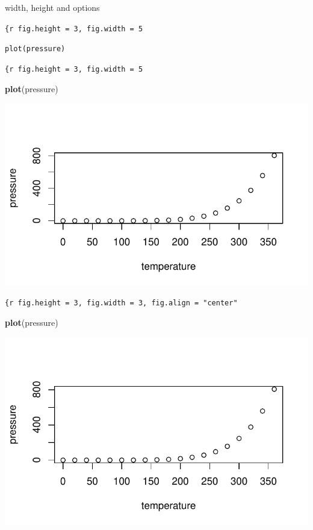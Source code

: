 \documentclass[
]{book}
\newenvironment{Shaded}{\begin{snugshade}}{\end{snugshade}}
\newcommand{\FunctionTok}[1]{\textcolor[rgb]{0.13,0.29,0.53}{\textbf{#1}}}
\newcommand{\NormalTok}[1]{#1}
\theoremstyle{definition}
\theoremstyle{definition}
\theoremstyle{definition}
\theoremstyle{definition}
\theoremstyle{remark}
\begin{document}
width, height and options

\texttt{\textasciigrave{}\textasciigrave{}\textasciigrave{}\{r\ fig.height\ =\ 3,\ fig.width\ =\ 5}

\texttt{plot(pressure)}

\texttt{\textasciigrave{}\textasciigrave{}\textasciigrave{}}

\texttt{\{r\ fig.height\ =\ 3,\ fig.width\ =\ 5}

\begin{Shaded}
\begin{Highlighting}[]
\FunctionTok{plot}\NormalTok{(pressure)}
\end{Highlighting}
\end{Shaded}

\includegraphics{202401280001-test_files/figure-latex/unnamed-chunk-4-1.pdf}

\texttt{\{r\ fig.height\ =\ 3,\ fig.width\ =\ 3,\ fig.align\ =\ "center"}

\begin{Shaded}
\begin{Highlighting}[]
\FunctionTok{plot}\NormalTok{(pressure)}
\end{Highlighting}
\end{Shaded}

\includegraphics{202401280001-test_files/figure-latex/unnamed-chunk-5-1.pdf}
\end{document}
